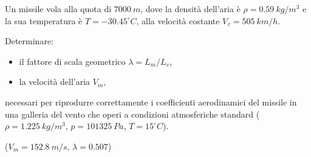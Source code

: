 \noindent
\begin{exerciseS}
Un missile vola alla quota di $7000\  m$, dove la densit\`{a} 
dell'aria \`{e} $\rho = 0.59\  kg/m^3$ e la sua temperatura 
\`e $T=-30.45^\circ   C$, alla velocit\`{a} costante $V_v=505\  km/h$.

Determinare:
\begin{itemize}
  \item il fattore di scala geometrico $\lambda=L_m/L_v$,
  \item la velocit\`{a} dell'aria $V_m$,
\end{itemize}
necessari per riprodurre correttamente i coefficienti aerodinamici 
del missile in una galleria del vento che operi a condizioni 
atmosferiche standard ($\rho=1.225\ kg/m^3$, $p=101325\ Pa$,
$T=15^\circ  C$).
    
($V_m =152.8\  m/s$, $\lambda=0.507$)
\end{exerciseS}

